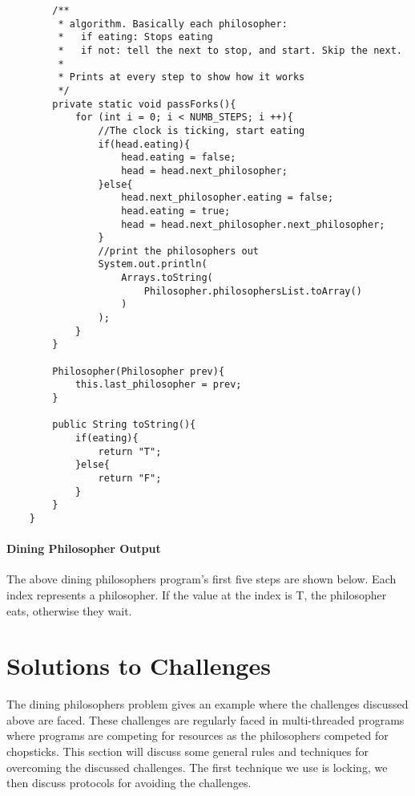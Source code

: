 \documentclass[titlepage]{article}
\begin{document}
\begin{lstlisting}
        /**
         * algorithm. Basically each philosopher:
         *   if eating: Stops eating
         *   if not: tell the next to stop, and start. Skip the next.
         *   
         * Prints at every step to show how it works
         */
        private static void passForks(){
            for (int i = 0; i < NUMB_STEPS; i ++){
                //The clock is ticking, start eating
                if(head.eating){
                    head.eating = false;
                    head = head.next_philosopher;
                }else{
                    head.next_philosopher.eating = false;
                    head.eating = true;
                    head = head.next_philosopher.next_philosopher;
                }
                //print the philosophers out
                System.out.println(
                    Arrays.toString(
                        Philosopher.philosophersList.toArray()
                    )
                );           
            }
        }
    
        Philosopher(Philosopher prev){
            this.last_philosopher = prev;
        }
    
        public String toString(){
            if(eating){
                return "T";
            }else{
                return "F";
            }
        }
    }
\end{lstlisting}


\paragraph{Dining Philosopher Output}

The above dining philosophers program's first five steps are shown below. Each index represents a philosopher. If the value at the index is T,  the philosopher eats, otherwise they wait.

\begin{python}
[F, T, F, T, F, T, F, T, F, F]
[T, F, F, T, F, T, F, T, F, F]
[T, F, T, F, F, T, F, T, F, F]
[T, F, T, F, T, F, F, T, F, F]
[T, F, T, F, T, F, T, F, F, F]
\end{python}


\section{Solutions to Challenges}
The dining philosophers problem gives an example where the challenges discussed above are faced. These challenges are regularly faced in multi-threaded programs where programs are competing for resources as the philosophers competed for chopsticks. This section will discuss some general rules and techniques for overcoming the discussed challenges. The first technique we use is locking, we then discuss protocols for avoiding the challenges.
\end{document}
